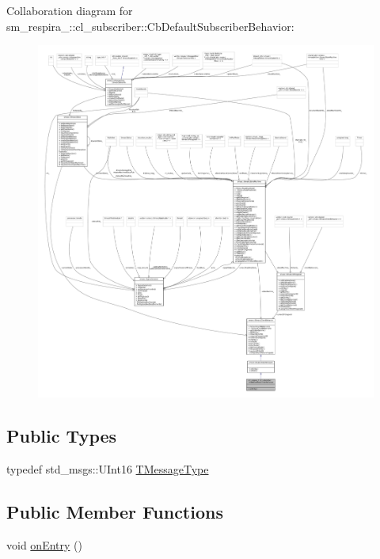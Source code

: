 Collaboration diagram for sm\+\_\+respira\+\_\+:\+:cl\+\_\+subscriber\+:\+:Cb\+Default\+Subscriber\+Behavior\+:
\nopagebreak
\begin{figure}[H]
\begin{center}
\leavevmode
\includegraphics[width=350pt]{classsm__respira__1_1_1cl__subscriber_1_1CbDefaultSubscriberBehavior__coll__graph}
\end{center}
\end{figure}
\subsection*{Public Types}
\begin{DoxyCompactItemize}
\item 
typedef std\+\_\+msgs\+::\+U\+Int16 \hyperlink{classsm__respira__1_1_1cl__subscriber_1_1CbDefaultSubscriberBehavior_a71b76903f2fdee5f359c512fea2531b3}{T\+Message\+Type}
\end{DoxyCompactItemize}
\subsection*{Public Member Functions}
\begin{DoxyCompactItemize}
\item 
void \hyperlink{classsm__respira__1_1_1cl__subscriber_1_1CbDefaultSubscriberBehavior_a7c2062f899b7fca2eb721ea4da144f62}{on\+Entry} ()
\end{DoxyCompactItemize}
